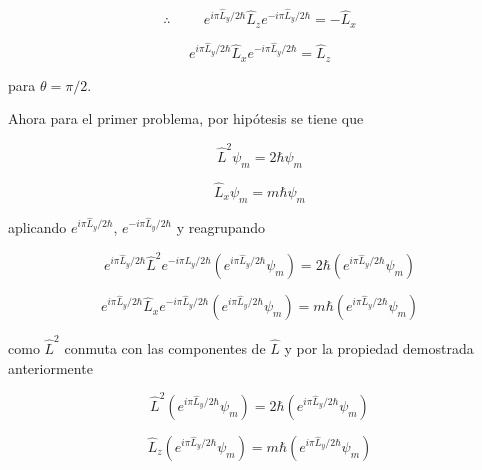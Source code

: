 \documentclass[12pt,a4paper]{article}
\begin{document}
\begin{enumerate}
 \begin{equation*}
     \therefore \hspace{1cm} e^{i\pi \hat{L}_{y}/2 \hbar} \hat{L}_{z} e^{-i\pi \hat{L}_{y}/2\hbar} = - \hat{L}_{x}
 \end{equation*}
 
 \begin{equation*}
    e^{i\pi \hat{L}_{y}/2 \hbar} \hat{L}_{x} e^{-i\pi \hat{L}_{y}/2 \hbar} = \hat{L}_{z}
\end{equation*}

para $\theta = \pi/2$.
 
 



Ahora para el primer problema, por hipótesis se tiene que

\begin{equation*}
    \hat{L}^2 \psi_{m} = 2 \hbar \psi_{m}
\end{equation*}

\begin{equation*}
    \hat{L}_{x} \psi_{m} = m \hbar \psi_{m}
\end{equation*}

aplicando $e^{i\pi \hat{L}_{y}/2\hbar}$, $e^{-i\pi \hat{L}_{y}/2\hbar}$ y reagrupando

\begin{equation*}
    e^{i\pi \hat{L}_{y}/2\hbar} \hat{L}^2e^{-i\pi \hat{L}_{y}/2\hbar}(e^{i\pi \hat{L}_{y}/2\hbar} \psi_{m}) = 2 \hbar (e^{i\pi \hat{L}_{y}/2\hbar} \psi_{m})
\end{equation*}

\begin{equation*}
    e^{i\pi \hat{L}_{y}/2\hbar} \hat{L}_{x}e^{-i\pi \hat{L}_{y}/2\hbar}(e^{i\pi \hat{L}_{y}/2\hbar} \psi_{m} )= m \hbar (e^{i\pi \hat{L}_{y}/2\hbar} \psi_{m})
\end{equation*}

como $\hat{L}^2$ conmuta con las componentes de $\hat{L}$ y por la propiedad demostrada anteriormente

\begin{equation*}
    \hat{L}^2(e^{i\pi \hat{L}_{y}/2\hbar} \psi_{m}) = 2 \hbar (e^{i\pi \hat{L}_{y}/2\hbar} \psi_{m})
\end{equation*}

\begin{equation*}
    \hat{L}_{z}(e^{i\pi \hat{L}_{y}/2\hbar} \psi_{m} )= m \hbar (e^{i\pi \hat{L}_{y}/2\hbar} \psi_{m})
\end{equation*}


\end{enumerate}
\end{document}

